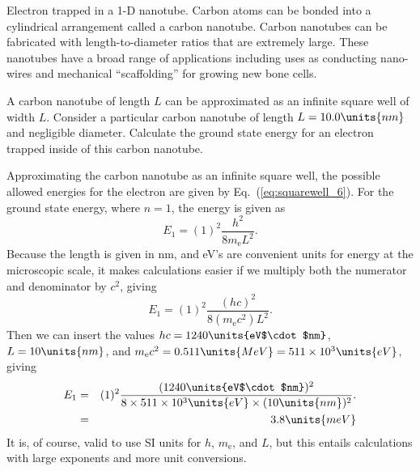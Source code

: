 \begin{example}{Electron trapped in a 1-D nanotube.}
\label{exam:nanoTube}
Carbon atoms can be bonded into a cylindrical arrangement called a
carbon nanotube.  Carbon nanotubes can be fabricated with
length-to-diameter ratios that are extremely large. These nanotubes
have a broad range of applications including uses as conducting nano-wires
and mechanical ``scaffolding'' for growing new bone cells.

A carbon nanotube of length $L$ can be approximated as an infinite 
square well of width $L$.  Consider a particular carbon nanotube 
of length $L = 10.0\units{nm}$ and negligible diameter.  Calculate 
the ground state energy for an electron trapped inside of this carbon nanotube.

\begin{solution}
Approximating the carbon nanotube as an infinite
square well, the possible allowed energies for the electron are 
given by Eq.~(\ref{eq:squarewell_6}).  For the ground state
energy, where $n = 1$, the energy is given as
\begin{equation}
E_1 = (1)^2 \frac{h^2}{8 m_\text{e} L^2}. 
\end{equation}
Because the length is given in nm, and eV's are convenient units 
for energy at the microscopic scale, it makes calculations easier 
if we multiply both the numerator and denominator by $c^2$, 
giving 
\begin{equation}
E_1 = (1)^2 \frac{(hc)^2}{8 (m_\text{e}c^2) L^2}. 
\end{equation}
Then we can insert the values $hc = 1240\units{eV$\cdot$nm}$, 
$L = 10\units{nm}$, and $m_\text{e}c^2 = 0.511\units{MeV} 
= 511\times 10^3\units{eV}$, giving
\begin{eqnarray}
E_1 &=& (1)^2 \frac{(1240\units{eV$\cdot$nm})^2}
    {8\times 511\times 10^3\units{eV}\times (10\units{nm})^2  }. \nonumber \\
    &=& 3.8\units {meV} 
\end{eqnarray} 
It is, of course, valid to use SI units for $h$, $m_\text{e}$, and $L$, but 
this entails calculations with large exponents and more unit conversions.
\end{solution}
\end{example}


